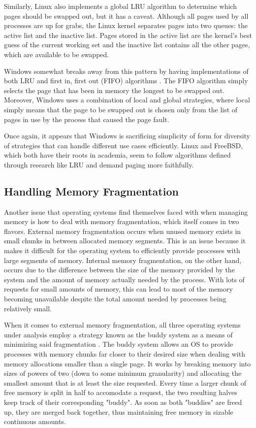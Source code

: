 \documentclass[onecolumn, draftclsnofoot,10pt, compsoc]{IEEEtran}
\begin{document}
Similarly, Linux also implements a global LRU algorithm to determine which pages should be swapped out, but it has a caveat. Although all pages used by all processes are up for grabs, the Linux kernel separates pages into two queues: the active list and the inactive list. Pages stored in the active list are the kernel's best guess of the current working set and the inactive list contains all the other pages, which are available to be swapped.

Windows somewhat breaks away from this pattern by having implementations of both LRU and first in, first out (FIFO) algorithms \cite{WindowsInternals2}. The FIFO algorithm simply selects the page that has been in memory the longest to be swapped out. Moreover, Windows uses a combination of local and global strategies, where local simply means that the page to be swapped out is chosen only from the list of pages in use by the process that caused the page fault.

Once again, it appears that Windows is sacrificing simplicity of form for diversity of strategies that can handle different use cases efficiently. Linux and FreeBSD, which both have their roots in academia, seem to follow algorithms defined through research like LRU and demand paging more faithfully.
\subsection{Handling Memory Fragmentation}
Another issue that operating systems find themselves faced with when managing memory is how to deal with memory fragmentation, which itself comes in two flavors. External memory fragmentation occurs when unused memory exists in small chunks in between allocated memory segments. This is an issue because it makes it difficult for the operating system to efficiently provide processes with large segments of memory. Internal memory fragmentation, on the other hand, occurs due to the difference between the size of the memory provided by the system and the amount of memory actually needed by the process. With lots of requests for small amounts of memory, this can lead to most of the memory becoming unavailable despite the total amount needed by processes being relatively small.

When it comes to external memory fragmentation, all three operating systems under analysis employ a strategy known as the buddy system as a means of minimizing said fragmentation \cite{Comparison2}\cite{WindowsInternals2}. The buddy system allows an OS to provide processes with memory chunks far closer to their desired size when dealing with memory allocations smaller than a single page. It works by breaking memory into sizes of powers of two (down to some minimum granularity) and allocating the smallest amount that is at least the size requested. Every time a larger chunk of free memory is split in half to accomodate a request, the two resulting halves keep track of their corresponding "buddy". As soon as both "buddies" are freed up, they are merged back together, thus maintaining free memory in sizable continuous amounts.
\end{document}
